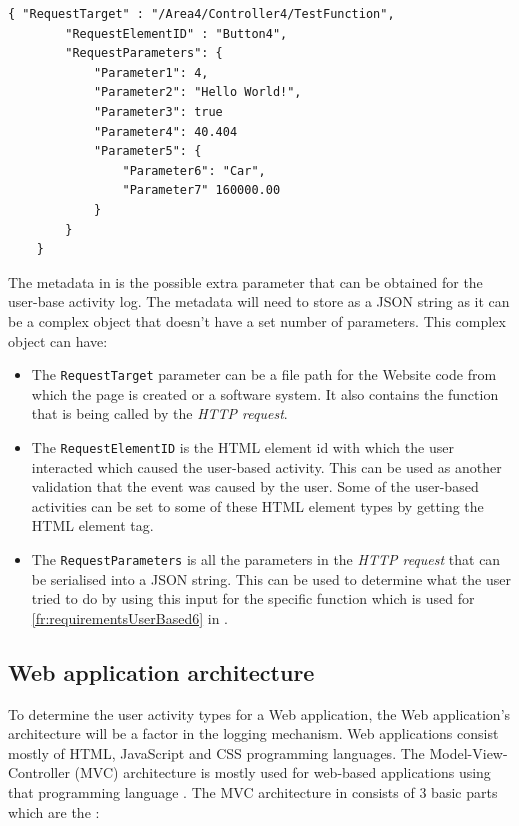 \begin{lstlisting}[style=json, caption={\textit{Metadata JSON}}, label={fig:ch2_MetadataJsonExample}] 
	{ "RequestTarget" : "/Area4/Controller4/TestFunction",
		"RequestElementID" : "Button4",
		"RequestParameters": {
			"Parameter1": 4,
			"Parameter2": "Hello World!",
			"Parameter3": true
			"Parameter4": 40.404
			"Parameter5": {
				"Parameter6": "Car",
				"Parameter7" 160000.00
			}
		}		
	}
\end{lstlisting}

The metadata in  is the possible extra parameter that can be obtained for the user-base activity log. The metadata will need to store as a JSON string as it can be a complex object that doesn't have a set number of parameters. This complex object can have:

\begin{itemize}
	\item The \texttt{RequestTarget} parameter can be a file path for the Website code from which the page is created or a software system. It also contains the function that is being called by the \textit{HTTP request}.
	\item The \texttt{RequestElementID} is the HTML element id with which the user interacted which caused the user-based activity. This can be used as another validation that the event was caused by the user. Some of the user-based activities can be set to some of these HTML element types by getting the HTML element tag.
	\item The \texttt{RequestParameters} is all the parameters in the \textit{HTTP request} that can be serialised into a JSON string. This can be used to determine what the user tried to do by using this input for the specific function which is used for \ref{fr:requirementsUserBased6} in .
\end{itemize}

\subsection{Web application architecture}\label{sec:ch2_webApplicationArchitecture}
To determine the user activity types for a Web application, the Web application's architecture will be a factor in the logging mechanism. Web applications consist mostly of HTML, JavaScript and CSS programming languages. The Model-View-Controller (MVC) architecture is mostly used for web-based applications using that programming language \cite{Jailia2016}. The MVC architecture in  consists of 3 basic parts which are the \cite{Jailia2016}:

